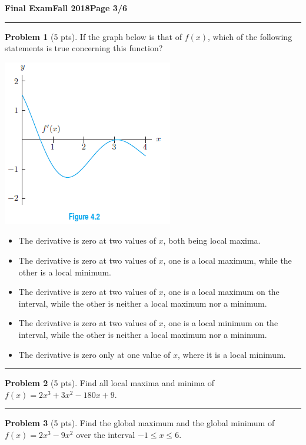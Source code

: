 \documentclass[12pt]{article}
\makeatletter
\theoremstyle{definition}
\newtheorem{problem}{Problem}
\newcommand*{\radiobutton}{%
  \@ifstar{\@radiobutton0}{\@radiobutton1}%
}
\newcommand*{\@radiobutton}[1]{%
  \begin{tikzpicture}
    \pgfmathsetlengthmacro\radius{height("X")/2}
    \draw[radius=\radius] circle;
    \ifcase#1 \fill[radius=.6*\radius] circle;\fi
  \end{tikzpicture}%
}
\makeatother
\begin{document}
\newpage

\hfill{\large\bf Final Exam}\hfill{\large\bf Fall 2018}\hfill{\large\bf Page 3/6}\hrule

\bigskip

\begin{problem}[5 pts]
If the graph below is that of $f(x)$, which of the following statements is true concerning this function?
\begin{multicols}{2}
\includegraphics{3graph2}
\vspace{2cm}

\begin{itemize}
\item[\radiobutton] The derivative is zero at two values of $x$, both being local maxima.
\item[\radiobutton] The derivative is zero at two values of $x$, one is a local maximum, while the other is a local minimum.
\item[\radiobutton] The derivative is zero at two values of $x$, one is a local maximum on the interval, while the other is neither a local maximum nor a minimum.
\item[\radiobutton] The derivative is zero at two values of $x$, one is a local minimum on the interval, while the other is neither a local maximum nor a minimum.
\item[\radiobutton] The derivative is zero only at one value of $x$, where it is a local minimum.
\end{itemize}
\end{multicols}
\end{problem}

\hrule
\begin{problem}[5 pts]
Find all local maxima and minima of $f(x) = 2x^3 + 3x^2-180x+9$.
\end{problem}
\vspace{5.5cm}
\hrule
\begin{problem}[5 pts]
Find the global maximum and the global minimum of $f(x) = 2x^3 - 9x^2$ over the interval $-1 \leq x \leq 6$.
\end{problem}
\end{document}

